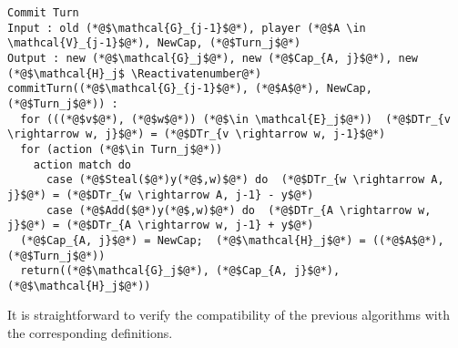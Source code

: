 \documentclass[11pt]{llncs}
\theoremstyle{definition}
\begin{document}
    \begin{lstlisting}[label=committurn, style=numbers]
Commit Turn
Input : old (*@$\mathcal{G}_{j-1}$@*), player (*@$A \in \mathcal{V}_{j-1}$@*), NewCap, (*@$Turn_j$@*)
Output : new (*@$\mathcal{G}_j$@*), new (*@$Cap_{A, j}$@*), new (*@$\mathcal{H}_j$ \Reactivatenumber@*)
commitTurn((*@$\mathcal{G}_{j-1}$@*), (*@$A$@*), NewCap, (*@$Turn_j$@*)) :
  for (((*@$v$@*), (*@$w$@*)) (*@$\in \mathcal{E}_j$@*))  (*@$DTr_{v \rightarrow w, j}$@*) = (*@$DTr_{v \rightarrow w, j-1}$@*)
  for (action (*@$\in Turn_j$@*))
    action match do
      case (*@$Steal($@*)y(*@$,w)$@*) do  (*@$DTr_{w \rightarrow A, j}$@*) = (*@$DTr_{w \rightarrow A, j-1} - y$@*)
      case (*@$Add($@*)y(*@$,w)$@*) do  (*@$DTr_{A \rightarrow w, j}$@*) = (*@$DTr_{A \rightarrow w, j-1} + y$@*)
  (*@$Cap_{A, j}$@*) = NewCap;  (*@$\mathcal{H}_j$@*) = ((*@$A$@*), (*@$Turn_j$@*))
  return((*@$\mathcal{G}_j$@*), (*@$Cap_{A, j}$@*), (*@$\mathcal{H}_j$@*))
    \end{lstlisting}
    It is straightforward to verify the compatibility of the previous algorithms with the corresponding definitions.
\end{document}
